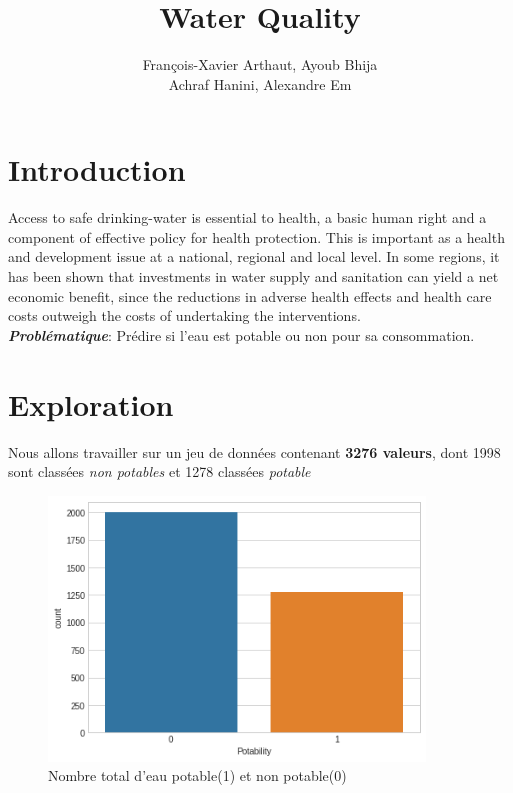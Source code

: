 \documentclass[12pt, a4paper]{article}
\title{\textbf{Water Quality}}
\author{François-Xavier Arthaut, Ayoub Bhija\\ Achraf Hanini, Alexandre Em}
\begin{document}
\maketitle

\section{Introduction}
Access to safe drinking-water is essential to health, a basic human right and a component of effective policy for health protection. This is important as a health and development issue at a national, regional and local level. In some regions, it has been shown that investments in water supply and sanitation can yield a net economic benefit, since the reductions in adverse health effects and health care costs outweigh the costs of undertaking the interventions.\\

\textbf{\textit{Problématique}}: Prédire si l'eau est potable ou non pour sa consommation.

\section{Exploration}
    Nous allons travailler sur un jeu de données contenant \textbf{3276 valeurs}, dont 1998 sont classées \textit{non potables} et 1278 classées \textit{potable}
        \begin{figure}[H]
           \centering
           \includegraphics[width=10cm]{images/output_9_2.png}
           \caption{Nombre total d'eau potable(1) et non potable(0)}
            \label{fig:gant}
        \end{figure}
        
\end{document}
